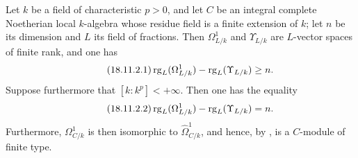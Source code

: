 \begin{lemma}[18.11.2]
\label{IV.18.11.2}
Let $k$ be a field of characteristic $p>0$, and let $C$ be an integral complete Noetherian local $k$-algebra whose residue field is a finite extension of $k$; let $n$ be its dimension and $L$ its field of fractions.
Then $\Omega^1_{L/k}$ and $\Upsilon_{L/k}$ are $L$-vector spaces of finite rank, and one has
\begin{equation}
\label{IV.18.11.2.1}
\tag{18.11.2.1}
  \operatorname{rg}_{L}(\Omega^1_{L/k})-\operatorname{rg}_{L}(\Upsilon_{L/k})\geq n.
\end{equation}
Suppose furthermore that $[k:k^p]<+\infty$.
Then one has the equality
\begin{equation}
\label{IV.18.11.2.2}
\tag{18.11.2.2}
  \operatorname{rg}_{L}(\Omega^1_{L/k})-\operatorname{rg}_{L}(\Upsilon_{L/k})=n.
\end{equation}
Furthermore, $\Omega^1_{C/k}$ is then isomorphic to $\hat{\Omega}^1_{C/k}$, and hence, by , is a $C$-module of finite type.
\end{lemma}

